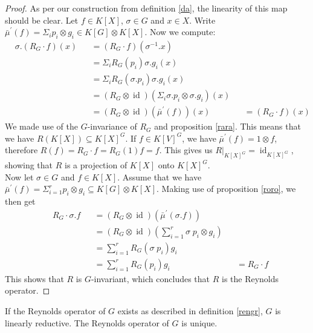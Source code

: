 \begin{proof}
  As per our construction from definition \ref{da}, the linearity of this map should be clear.
  Let $f \in K[X]$, $\sigma \in G$ and $x \in X$.
  Write $\bar{\mu}^\prime (f) = \Sigma_i p_i \otimes g_i \in K[G] \otimes K[X] $.
  Now we compute:
  \begin{equation}
    \begin{aligned}
      &\sigma. \left( R_G \cdot f \right) (x)
      &&= \left( R_G \cdot f \right) (\sigma^{-1}.x)\\
      &&&= \Sigma_i R_G \left( p_i \right)  \sigma.g_i \left(  x \right) \\
      &&&= \Sigma_i R_G (\sigma.p_i)  \sigma.g_i (x)\\
      &&&= \left( R_G \otimes \operatorname{id} \right) \left( \Sigma_i \sigma.p_i \otimes \sigma.g_i \right) (x)\\
      &&&= (R_G \otimes \operatorname{id}) (\bar{\mu}^\prime (f)) (x)
      &&= (R_G \cdot f) (x)
    \end{aligned}
  \end{equation}
  We made use of the $G$-invariance of $R_G$ and proposition \ref{rara}.
  This means that we have $R(K[X]) \subseteq K[X]^G$.
  If $f \in K[V]^G$, we have $\bar{\mu}^\prime (f) = 1 \otimes f$, therefore $R(f) = R_G \cdot f = R_G (1)f = f$.
  This gives us $\left. R \right|_{K[X]^G} = \operatorname{id}_{K[X]^G}$, showing that $R$ is a projection of $K[X]$ onto $K[X]^G$.\\
  Now let $\sigma \in G$ and $ f \in K[X]$.
  Assume that we have $\bar{\mu}^\prime(f) = \Sigma_{i=1}^r p_i \otimes g_i \subseteq K[G] \otimes K[X]$.
  Making use of proposition \ref{roro}, we then get
  \begin{equation}
    \begin{aligned}
      &R_G \cdot \sigma.f
      &&= (R_G \otimes \operatorname{id}) \left(\bar{\mu}^\prime(\sigma.f)\right)\\
      &&&= (R_G \otimes \operatorname{id}) \left(\sum_{i=1}^r \sigma \dot{\phantom{.}}p_i \otimes g_i \right)\\
      &&&= \sum_{i=1}^r R_G(\sigma\dot{\phantom{.}}p_i)g_i\\
      &&&= \sum_{i=1}^r R_G(p_i)g_i
      &&= R_G \cdot f
    \end{aligned}
  \end{equation}
This shows that $R$ is $G$-invariant, which concludes that $R$ is the Reynolds operator.
\end{proof}

\begin{corollary}
  If the Reynolds operator of $G$ exists as described in definition \ref{rengr}, $G$ is linearly reductive.
  The Reynolds operator of $G$ is unique.
\end{corollary}
